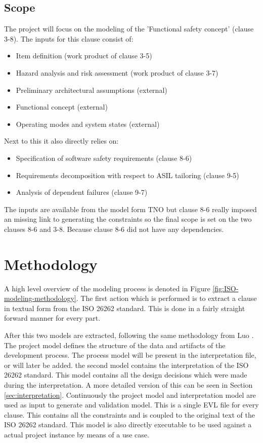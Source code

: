 \documentclass[a4paper]{article}
\newcommand{\ISO}{ISO 26262 standard\xspace}
\begin{document}
\subsection{Scope}
The project will focus on the modeling of the 'Functional safety concept' (clause 3-8).
The inputs for this clause consist of:
\begin{itemize}
\item Item definition (work product of clause 3-5)
\item Hazard analysis and risk assessment (work product of clause 3-7)
\item Preliminary architectural assumptions (external)
\item Functional concept (external)
\item Operating modes and system states (external)
\end{itemize}
Next to this it also directly relies on:
\begin{itemize}
\item Specification of software safety requirements (clause 8-6)
\item Requirements decomposition with respect to ASIL tailoring (clause 9-5)
\item Analysis of dependent failures (clause 9-7)
\end{itemize}
The inputs are available from the model form TNO but clause 8-6 really imposed an missing link to generating the constraints so the final scope is set on the two clauses 8-6 and 3-8. Because clause 8-6 did not have any dependencies.

\section{Methodology} \label{sec:methodology}
A high level overview of the modeling process is denoted in Figure \ref{fig:ISO-modeling-methodology}.
The first action which is performed is to extract a clause in textual form from the \ISO.
This is done in a fairly straight forward manner for every part.

After this two models are extracted, following the same methodology from Luo \cite{thesis.luna}.
The project model defines the structure of the data and artifacts of the development process.
The process model will be present in the interpretation file, or will later be added.
the second model contains the interpretation of the \ISO.
This model contains all the design decisions which were made during the interpretation.
A more detailed version of this can be seen in Section \ref{sec:interpretation}.
Continuously the project model and interpretation model are used as input to generate and validation model.
This is a single EVL file for every clause.
This contains all the constraints and is coupled to the original text of the \ISO.
This model is also directly executable to be used against a actual project instance by means of a use case.
\end{document}
